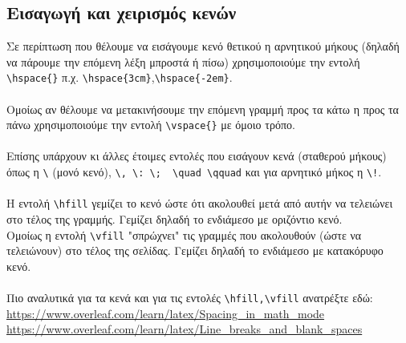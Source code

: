 \documentclass[a4paper, 12pt, oneside, xelatex, final]{article}
\begin{document}
	\subsection{Εισαγωγή και χειρισμός κενών}
	\noindent Σε περίπτωση που θέλουμε να εισάγουμε κενό θετικού η αρνητικού μήκους (δηλαδή να πάρουμε την επόμενη λέξη μπροστά ή πίσω) χρησιμοποιούμε την εντολή \verb+\hspace{}+ π.χ. \verb+\hspace{3cm}+,\verb+\hspace{-2em}+.\\ \\
	Ομοίως αν θέλουμε να μετακινήσουμε την επόμενη γραμμή προς τα κάτω η προς τα πάνω χρησιμοποιούμε την εντολή  \verb+\vspace{}+ με όμοιο τρόπο.\\ \\
	Επίσης υπάρχουν κι άλλες έτοιμες εντολές που εισάγουν κενά (σταθερού μήκους) όπως η \verb+\+ (μονό κενό), \verb+\, \: \;  \quad \qquad+ και για αρνητικό μήκος η \verb+\!+. \\ \\
	Η εντολή \verb+\hfill+ γεμίζει το κενό ώστε ότι ακολουθεί μετά από αυτήν να τελειώνει στο τέλος της γραμμής. Γεμίζει δηλαδή το ενδιάμεσο με οριζόντιο κενό.\\
	Ομοίως η εντολή  \verb+\vfill+ "σπρώχνει" τις γραμμές που ακολουθούν (ώστε να τελειώνουν) στο τέλος της σελίδας. Γεμίζει δηλαδή το ενδιάμεσο με κατακόρυφο κενό.\\ \\
	Πιο αναλυτικά για τα κενά και για τις εντολές \verb+\hfill,\vfill+ ανατρέξτε εδώ:\\
	\url{https://www.overleaf.com/learn/latex/Spacing_in_math_mode}\\
	\url{https://www.overleaf.com/learn/latex/Line_breaks_and_blank_spaces}
	
\end{document}
